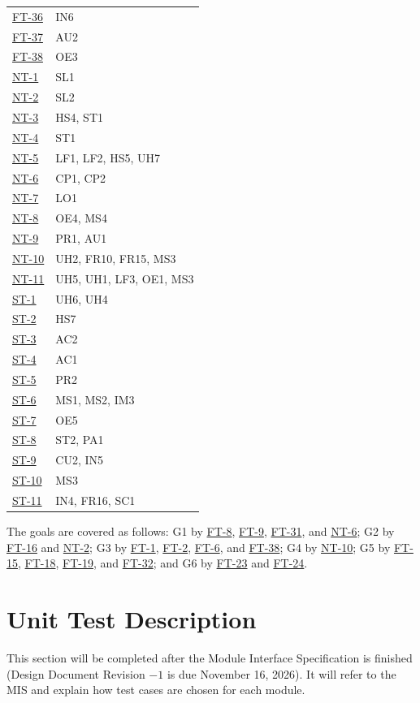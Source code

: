 \documentclass[12pt, titlepage]{article}
\newcommand{\tref}[1]{\hyperlink{test:#1}{#1}}
\begin{document}
\begin{longtable}{@{}P{0.12\textwidth}P{0.84\textwidth}@{}}
\tref{FT-36} & IN6\\
\tref{FT-37} & AU2\\
\tref{FT-38} & OE3\\
\tref{NT-1} & SL1\\
\tref{NT-2} & SL2\\
\tref{NT-3} & HS4, ST1\\
\tref{NT-4} & ST1\\
\tref{NT-5} & LF1, LF2, HS5, UH7\\
\tref{NT-6} & CP1, CP2\\
\tref{NT-7} & LO1\\
\tref{NT-8} & OE4, MS4\\
\tref{NT-9} & PR1, AU1\\
\tref{NT-10} & UH2, FR10, FR15, MS3\\
\tref{NT-11} & UH5, UH1, LF3, OE1, MS3\\
\tref{ST-1} & UH6, UH4\\
\tref{ST-2} & HS7\\
\tref{ST-3} & AC2\\
\tref{ST-4} & AC1\\
\tref{ST-5} & PR2\\
\tref{ST-6} & MS1, MS2, IM3\\
\tref{ST-7} & OE5\\
\tref{ST-8} & ST2, PA1\\
\tref{ST-9} & CU2, IN5\\
\tref{ST-10} & MS3\\
\tref{ST-11} & IN4, FR16, SC1\\
\bottomrule
\end{longtable}

The goals are covered as follows: G1 by \tref{FT-8}, \tref{FT-9}, \tref{FT-31}, and
\tref{NT-6}; G2 by \tref{FT-16} and \tref{NT-2}; G3 by \tref{FT-1}, \tref{FT-2},
\tref{FT-6}, and \tref{FT-38}; G4 by \tref{NT-10}; G5 by \tref{FT-15},
\tref{FT-18}, \tref{FT-19}, and \tref{FT-32}; and G6 by \tref{FT-23} and
\tref{FT-24}.

\section{Unit Test Description} \label{SecUnitTests}

This section will be completed after the Module Interface Specification is
finished (Design Document Revision $-1$ is due November 16, 2026). It will refer
to the MIS and explain how test cases are chosen for each module.
\end{document}
